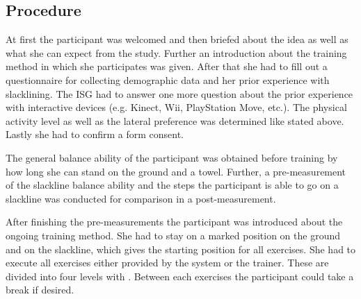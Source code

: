 \subsection{Procedure}
At first the participant was welcomed and then briefed about the idea as well as what she can expect from the study. Further an introduction about the training method in which she participates was given. After that she had to fill out a questionnaire for collecting demographic data and her prior experience with slacklining. The ISG had to answer one more question about the prior experience with interactive devices (e.g. Kinect, Wii, PlayStation Move, etc.).
The physical activity level as well as the lateral preference was determined like stated above. Lastly she had to confirm a form consent.


The general balance ability of the participant was obtained before training by how long she can stand on the ground and a towel.
Further, a pre-measurement of the slackline balance ability and the steps the participant is able to go on a slackline was conducted for comparison in a post-measurement.

After finishing the pre-measurements the participant was introduced about the ongoing training method.
She had to stay on a marked position on the ground and on the slackline, which gives the starting position for all exercises. 
She had to execute all exercises either provided by the system or the trainer.
These are divided into four levels with .
Between each exercises the participant could take a break if desired.

